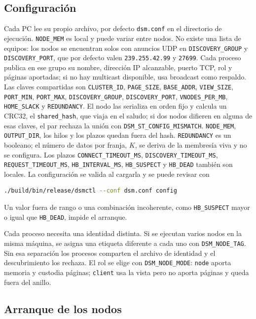 \documentclass[11pt,spanish]{article}
\begin{document}
\subsection{Configuración}

Cada PC lee su propio archivo, por defecto \texttt{dsm.conf} en el directorio de ejecución. \texttt{NODE\_MEM} es local y puede variar entre nodos. No existe una lista de equipos: los nodos se encuentran solos con anuncios UDP en \texttt{DISCOVERY\_GROUP} y \texttt{DISCOVERY\_PORT}, que por defecto valen \texttt{239.255.42.99} y \texttt{27699}. Cada proceso publica en ese grupo su nombre, dirección IP alcanzable, puerto TCP, rol y páginas aportadas; si no hay multicast disponible, usa broadcast como respaldo. Las claves compartidas son \texttt{CLUSTER\_ID}, \texttt{PAGE\_SIZE}, \texttt{BASE\_ADDR}, \texttt{VIEW\_SIZE}, \texttt{PORT\_MIN}, \texttt{PORT\_MAX}, \texttt{DISCOVERY\_GROUP}, \texttt{DISCOVERY\_PORT}, \texttt{VNODES\_PER\_MB}, \texttt{HOME\_SLACK} y \texttt{REDUNDANCY}. El nodo las serializa en orden fijo y calcula un CRC32, el \texttt{shared\_hash}, que viaja en el saludo; si dos nodos difieren en alguna de esas claves, el par rechaza la unión con \texttt{DSM\_ST\_CONFIG\_MISMATCH}. \texttt{NODE\_MEM}, \texttt{OUTPUT\_DIR}, los hilos y los plazos quedan fuera del hash. \texttt{REDUNDANCY} es un booleano; el número de datos por franja, $K$, se deriva de la membresía viva y no se configura. Los plazos \texttt{CONNECT\_TIMEOUT\_MS}, \texttt{DISCOVERY\_TIMEOUT\_MS}, \texttt{REQUEST\_TIMEOUT\_MS}, \texttt{HB\_INTERVAL\_MS}, \texttt{HB\_SUSPECT} y \texttt{HB\_DEAD} también son locales. La configuración se valida al cargarla y se puede revisar con
\begin{lstlisting}[language=bash]
./build/bin/release/dsmctl --conf dsm.conf config
\end{lstlisting}
Un valor fuera de rango o una combinación incoherente, como \texttt{HB\_SUSPECT} mayor o igual que \texttt{HB\_DEAD}, impide el arranque.

Cada proceso necesita una identidad distinta. Si se ejecutan varios nodos en la misma máquina, se asigna una etiqueta diferente a cada uno con \texttt{DSM\_NODE\_TAG}. Sin esa separación los procesos comparten el archivo de identidad y el descubrimiento los rechaza. El rol se elige con \texttt{DSM\_NODE\_MODE}: \texttt{node} aporta memoria y custodia páginas; \texttt{client} usa la vista pero no aporta páginas y queda fuera del anillo.

\subsection{Arranque de los nodos}
\end{document}
